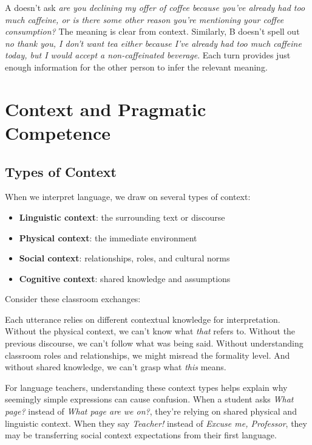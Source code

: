 A doesn't ask \textit{are you declining my offer of coffee because you've already had too much caffeine, or is there some other reason you're mentioning your coffee consumption?} The meaning is clear from context. Similarly, B doesn't spell out \textit{no thank you, I don't want tea either because I've already had too much caffeine today, but I would accept a non-caffeinated beverage}. Each turn provides just enough information for the other person to infer the relevant meaning.



\section{Context and Pragmatic Competence}
\subsection{Types of Context}
When we interpret language, we draw on several types of context:

\begin{itemize}
    \item \textbf{Linguistic context}: the surrounding text or discourse
    \item \textbf{Physical context}: the immediate environment
    \item \textbf{Social context}: relationships, roles, and cultural norms
    \item \textbf{Cognitive context}: shared knowledge and assumptions
\end{itemize}

Consider these classroom exchanges:
\ea
    \z
\z

Each utterance relies on different contextual knowledge for interpretation. Without the physical context, we can't know what \textit{that} refers to. Without the previous discourse, we can't follow what was being said. Without understanding classroom roles and relationships, we might misread the formality level. And without shared knowledge, we can't grasp what \textit{this} means.

For language teachers, understanding these context types helps explain why seemingly simple expressions can cause confusion. When a student asks \textit{What page?} instead of \textit{What page are we on?}, they're relying on shared physical and linguistic context. When they say \textit{Teacher!} instead of \textit{Excuse me, Professor}, they may be transferring social context expectations from their first language.

